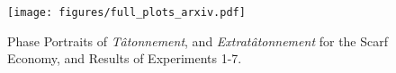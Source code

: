 
\begin{figure}[htbp]
    \texttt{[image: figures/full\_plots\_arxiv.pdf]}
    \caption{Phase Portraits  of \emph{T\^atonnement}, and \emph{Extrat\^atonnement} for the Scarf Economy, and Results of Experiments 1-7.}
    \label{fig:exp_results}
\end{figure}

